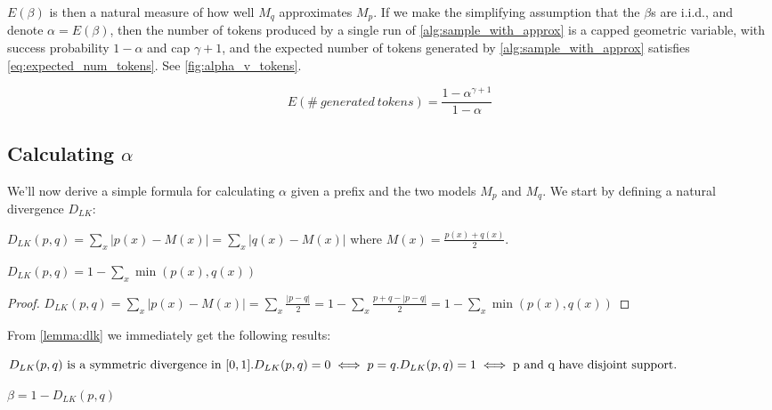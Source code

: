 $E(\beta)$ is then a natural measure of how well $M_q$ approximates $M_p$. If we make the simplifying assumption that the $\beta$s are i.i.d., and denote $\alpha = E(\beta)$, then the number of tokens produced by a single run of \ref{alg:sample_with_approx} is a capped geometric variable, with success probability $1 - \alpha$ and cap $\gamma + 1$, and the expected number of tokens generated by \ref{alg:sample_with_approx} satisfies \ref{eq:expected_num_tokens}. See \ref{fig:alpha_v_tokens}.

\begin{equation}
\label{eq:expected_num_tokens}
E(\#\ generated\ tokens) = \frac{1 - \alpha^{\gamma + 1}}{1 - \alpha}
\end{equation}

\subsection{Calculating $\alpha$}

We'll now derive a simple formula for calculating $\alpha$ given a prefix and the two models $M_p$ and $M_q$. We start by defining a natural divergence $D_{LK}$:

\begin{definition}
\label{def:dlk}
$D_{LK}(p, q) = \sum_{x}|p(x) - M(x)| = \sum_{x}|q(x) - M(x)|$ where $M(x) = \frac{p(x) + q(x)}{2}$.
\end{definition}

\begin{lemma}
\label{lemma:dlk}
$D_{LK}(p, q) = 1 - \sum_x\min(p(x), q(x))$
\end{lemma}

\begin{proof}
$D_{LK}(p, q) = \sum_{x}|p(x) - M(x)| = \sum_x\frac{|p-q|}{2}= 1 - \sum_x\frac{p + q - |p - q|}{2} = 1 - \sum_x\min(p(x), q(x))$
\end{proof}

From \ref{lemma:dlk} we immediately get the following results:

\begin{corollary}
\label{cor:dlk_properties}
$D_{LK}(p, q)\ \text{is a symmetric divergence in}\ [0, 1].\\
D_{LK}(p, q) = 0 \iff p = q. \\
D_{LK}(p, q) = 1 \iff \text{p and q have disjoint support}.$
\end{corollary}

\begin{theorem}
\label{thm:dlk_beta}
$\beta = 1 - D_{LK}(p, q)$
\end{theorem}

